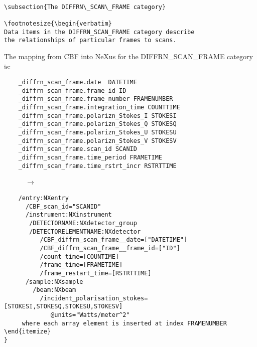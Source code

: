 \documentclass[11pt]{article}
\begin{document}
{{{\begin{verbatim}
                                                                                                                                                                                                                                                                                                                                                                                                                                                                                                                                                                                                                                                                                                                                                                                                                                                                                                                                                                                                                                                                \subsection{The DIFFRN\_SCAN\_FRAME category}

\footnotesize{\begin{verbatim}
Data items in the DIFFRN_SCAN_FRAME category describe
the relationships of particular frames to scans.
\end{verbatim}

The mapping from CBF into NeXus for the DIFFRN\_SCAN\_FRAME category is:

\begin{verbatim}     
    _diffrn_scan_frame.date  DATETIME
    _diffrn_scan_frame.frame_id ID
    _diffrn_scan_frame.frame_number FRAMENUMBER
    _diffrn_scan_frame.integration_time COUNTTIME
    _diffrn_scan_frame.polarizn_Stokes_I STOKESI
    _diffrn_scan_frame.polarizn_Stokes_Q STOKESQ
    _diffrn_scan_frame.polarizn_Stokes_U STOKESU
    _diffrn_scan_frame.polarizn_Stokes_V STOKESV
    _diffrn_scan_frame.scan_id SCANID
    _diffrn_scan_frame.time_period FRAMETIME
    _diffrn_scan_frame.time_rstrt_incr RSTRTTIME
\end{verbatim}
~~~~~~{\bf{}$\rightarrow$}\\
\begin{verbatim}
    /entry:NXentry
      /CBF_scan_id="SCANID"
      /instrument:NXinstrument
       /DETECTORNAME:NXdetector_group
       /DETECTORELEMENTNAME:NXdetector
          /CBF_diffrn_scan_frame__date=["DATETIME"]
          /CBF_diffrn_scan_frame__frame_id=["ID"]
          /count_time=[COUNTIME]
          /frame_time=[FRAMETIME]
          /frame_restart_time=[RSTRTTIME]
      /sample:NXsample
        /beam:NXbeam
          /incident_polarisation_stokes=[STOKESI,STOKESQ,STOKESU,STOKESV]
             @units="Watts/meter^2"
     where each array element is inserted at index FRAMENUMBER          
\end{itemize}
}



\end{verbatim}}}}
\end{document}
